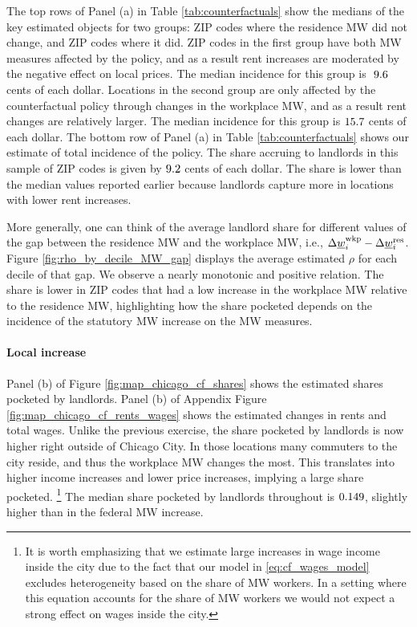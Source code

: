 The top rows of Panel (a) in Table \ref{tab:counterfactuals} show the medians of 
the key estimated objects for two groups:
ZIP codes where the residence MW did not change, and 
ZIP codes where it did.
ZIP codes in the first group have both MW measures affected by the policy,
and as a result rent increases are moderated by the negative effect on local
prices.
The median incidence for this group is $\textnormal{ 9.6}$ cents of each 
dollar.
Locations in the second group are only affected by the counterfactual policy 
through changes in the workplace MW, and as a result rent changes are 
relatively larger.
The median incidence for this group is $\textnormal{15.7}$ cents of each 
dollar.
The bottom row of Panel (a) in Table \ref{tab:counterfactuals} shows our estimate
of total incidence of the policy.
The share accruing to landlords in this sample of ZIP codes is given by 
$\textnormal{9.2}$ cents of each dollar.
The share is lower than the median values reported earlier because landlords 
capture more in locations with lower rent increases.

More generally, one can think of the average landlord share for different 
values of the gap between the residence MW and the workplace MW, 
i.e., $\Delta \underline{w}_i^{\text{wkp}} - \Delta \underline{w}_i^{\text{res}}$.
Figure \ref{fig:rho_by_decile_MW_gap} displays the average estimated $\rho$ for 
each decile of that gap.
We observe a nearly monotonic and positive relation.
The share is lower in ZIP codes that had a low increase in the workplace MW 
relative to the residence MW, highlighting how the share pocketed depends on
the incidence of the statutory MW increase on the MW measures.

\paragraph{Local increase}

Panel (b) of Figure \ref{fig:map_chicago_cf_shares} shows the 
estimated shares pocketed by landlords.
Panel (b) of Appendix Figure \ref{fig:map_chicago_cf_rents_wages} shows the 
estimated changes in rents and total wages.
Unlike the previous exercise, the share pocketed by landlords is now higher 
right outside of Chicago City.
In those locations many commuters to the city reside, and thus the workplace
MW changes the most.
This translates into higher income increases and lower price increases, implying
a large share pocketed.%
\footnote{It is worth emphasizing that we estimate large increases in wage income
inside the city due to the fact that our model in \eqref{eq:cf_wages_model}
excludes heterogeneity based on the share of MW workers.
In a setting where this equation accounts for the share of MW workers we would 
not expect a strong effect on wages inside the city.} 
The median share pocketed by landlords throughout is $\textnormal{0.149}$, 
slightly higher than in the federal MW increase.

